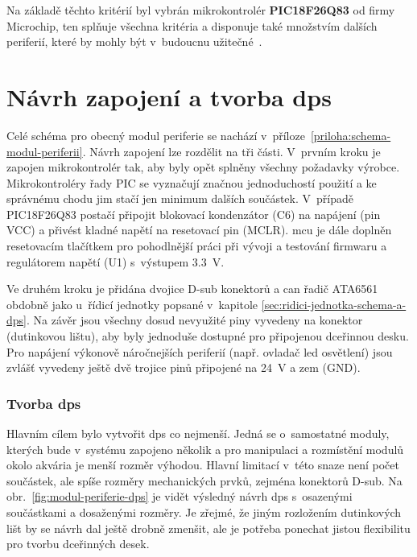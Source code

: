         Na základě těchto kritérií byl vybrán mikrokontrolér \textbf{PIC18F26Q83} od firmy Microchip, ten splňuje všechna kritéria a disponuje také množstvím dalších periferií, které by mohly být v~budoucnu užitečné~\cite{PIC18F26Q83}.

    \section{Návrh zapojení a tvorba \acs{dps}}
        Celé schéma pro obecný modul periferie se nachází v~příloze~\ref{priloha:schema-modul-periferii}. Návrh zapojení lze rozdělit na tři části. V~prvním kroku je zapojen mikrokontrolér tak, aby byly opět splněny všechny požadavky výrobce. Mikrokontroléry řady PIC se vyznačují značnou jednoduchostí použití a ke správnému chodu jim stačí jen minimum dalších součástek. V~případě PIC18F26Q83 postačí připojit blokovací kondenzátor (C6) na napájení (pin VCC) a přivést kladné napětí na resetovací pin (MCLR). \acs{mcu} je dále doplněn resetovacím tlačítkem pro pohodlnější práci při vývoji a testování firmwaru a regulátorem napětí (U1) s~výstupem \qty{3.3}{V}. 

        Ve druhém kroku je přidána dvojice D-sub konektorů a \acs{can} řadič ATA6561 obdobně jako u~řídicí jednotky popsané v~kapitole \ref{sec:ridici-jednotka-schema-a-dps}. Na závěr jsou všechny dosud nevyužité piny vyvedeny na konektor (dutinkovou lištu), aby byly jednoduše dostupné pro připojenou dceřinnou desku. Pro napájení výkonově náročnejších periferií (např. ovladač \acs{led} osvětlení) jsou zvlášť vyvedeny ještě dvě trojice pinů připojené na \qty{24}{V} a zem (GND).

        \subsubsection{Tvorba \acs{dps}}
        Hlavním cílem bylo vytvořit \acs{dps} co nejmenší. Jedná se o~samostatné moduly, kterých bude v~systému zapojeno několik a pro manipulaci a rozmístění modulů okolo akvária je menší rozměr výhodou. Hlavní limitací v~této snaze není počet součástek, ale spíše rozměry mechanických prvků, zejména konektorů D-sub. Na obr.~\ref{fig:modul-periferie-dps} je vidět výsledný návrh \acs{dps} s~osazenými součástkami a dosaženými rozměry. Je zřejmé, že jiným rozložením dutinkových lišt by se návrh dal ještě drobně zmenšit, ale je potřeba ponechat jistou flexibilitu pro tvorbu dceřinných desek.

